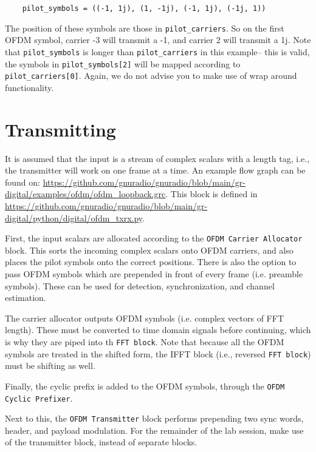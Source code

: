 \begin{verbatim}
    pilot_symbols = ((-1, 1j), (1, -1j), (-1, 1j), (-1j, 1))
\end{verbatim}
The position of these symbols are those in \texttt{pilot_carriers}. So on the first OFDM symbol, carrier -3 will transmit a -1, and carrier 2 will transmit a 1j. Note that \texttt{pilot_symbols} is longer than \texttt{pilot_carriers} in this example-- this is valid, the symbols in \texttt{pilot_symbols[2]} will be mapped according to \texttt{pilot_carriers[0]}. Again, we do not advise you to make use of wrap around functionality.

\section{Transmitting}

It is assumed that the input is a stream of complex scalars with a length tag, i.e., the transmitter will work on one frame at a time. An example flow graph can be found on: \url{https://github.com/gnuradio/gnuradio/blob/main/gr-digital/examples/ofdm/ofdm_loopback.grc}. This block is defined in \url{https://github.com/gnuradio/gnuradio/blob/main/gr-digital/python/digital/ofdm_txrx.py}.






First, the input scalars are allocated according to the \texttt{OFDM Carrier Allocator} block. This sorts the incoming complex scalars onto OFDM carriers, and also places the pilot symbols onto the correct positions. There is also the option to pass OFDM symbols which are prepended in front of every frame (i.e. preamble symbols). These can be used for detection, synchronization, and channel estimation.

The carrier allocator outputs OFDM symbols (i.e. complex vectors of FFT length). These must be converted to time domain signals before continuing, which is why they are piped into th \texttt{FFT block}. Note that because all the OFDM symbols are treated in the shifted form, the IFFT block (i.e., reversed \texttt{FFT block}) must be shifting as well.

Finally, the cyclic prefix is added to the OFDM symbols, through the \texttt{OFDM Cyclic Prefixer}.

Next to this, the \texttt{OFDM Transmitter} block performs prepending two sync words, header, and payload modulation. For the remainder of the lab session, make use of the transmitter block, instead of separate blocks.

